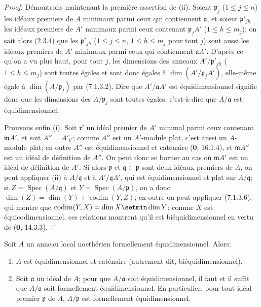 \begin{proof}
Démontrons maintenant la première assertion de (ii). Soient $\mathfrak p_j$
($1\leqslant j\leqslant n$) les idéaux premiers de $A$ minimaux parmi ceux
qui contiennent $\mathfrak a$, et soient $\mathfrak p'_{jh}$ les idéaux
premiers de $A'$ minimaux parmi ceux contenant $\mathfrak p_jA'$
($1\leqslant h\leqslant m_j$); on sait alors (2.3.4) que les
$\mathfrak p'_{jh}$ ($1\leqslant j\leqslant n$, $1\leqslant h\leqslant
m_j$ pour tout $j$) sont aussi les idéaux premiers de $A'$ minimaux parmi
ceux qui contiennent $\mathfrak aA'$. D'après ce qu'on a vu plus haut, pour
tout $j$, les dimensions des anneaux $A'/\mathfrak p'_{jh}$
($1\leqslant h\leqslant m_j$) sont toutes égales et sont donc égales à
$\dim(A'/\mathfrak p_jA')$, elle-même égale à $\dim(A/\mathfrak p_j)$ par
(7.1.3.2). Dire que $A'/\mathfrak aA'$ est équidimensionnel signifie donc
que les dimensions des $A/\mathfrak p_j$ sont toutes égales, c'est-à-dire
que $A/\mathfrak a$ est équidimensionnel.

Prouvons enfin (i). Soit $\mathfrak r'$ un idéal premier de $A'$ minimal
parmi ceux contenant $\mathfrak mA'$, et soit $A''=A'_{\mathfrak r'}$;
comme $A''$ est un $A'$-module plat, c'est aussi un $A$-module plat; en
outre $A''$ est équidimensionnel et caténaire (\textbf{0}, 16.1.4), et
$\mathfrak mA''$ est un idéal de définition de $A''$. On peut donc se
borner au cas où $\mathfrak mA'$ est un idéal de définition de $A'$. Si
alors $\mathfrak p$ et $\mathfrak q\subset\mathfrak p$ sont deux idéaux
premiers de $A$, on peut appliquer (ii) à $A/\mathfrak q$ et à
$A'/\mathfrak qA'$, qui est équidimensionnel et plat sur
$A/\mathfrak q$; si $Z=\operatorname{Spec}(A/\mathfrak q)$ et
$Y=\operatorname{Spec}(A/\mathfrak p)$, on a donc
$\dim(Z)=\dim(Y)+\operatorname{codim}(Y,Z)$; en outre on peut appliquer
(7.1.3.6), qui montre que
$\operatorname{codim}(Y,X)=\dim X\setmin\dim Y$; comme $X$ est
équicodimensionnel, ces relations montrent qu'il est biéquidimensionnel en
vertu de (\textbf{0}, 14.3.3).
\end{proof}

\begin{corollary}[7.1.4]
\label{IV.2.s7.1.4-fr}
Soit $A$ un anneau local noethérien formellement équidimensionnel. Alors:
\begin{enumerate}
\item[\textup{(i)}] $A$ est équidimensionnel et caténaire \textup{(autrement dit,}
biéquidimensionnel\textup{)}.
\item[\textup{(ii)}] Soit $\mathfrak a$ un idéal de $A$; pour que $A/\mathfrak a$ soit
équidimensionnel, il faut et il suffit que $A/\mathfrak a$ soit formellement
équidimensionnel. En particulier, pour tout idéal premier $\mathfrak p$ de
$A$, $A/\mathfrak p$ est formellement équidimensionnel.
\end{enumerate}
\end{corollary}

